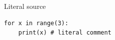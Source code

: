 \documentclass{beamer}
\begin{document}
\begin{frame}[fragile]{Literal source}
\begin{verbatim}
for x in range(3):
    print(x) # literal comment
\end{verbatim}
\end{frame}
\end{document}
